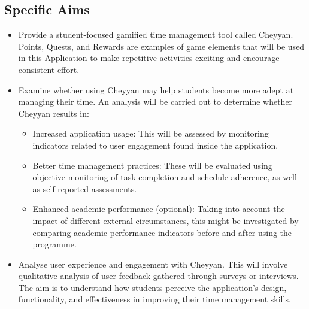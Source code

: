 \documentclass{l4proj}
\begin{document}
\subsection{Specific Aims}
\begin{itemize}
\item 
Provide a student-focused gamified time management tool called Cheyyan. Points, Quests, and Rewards are examples of game elements that will be used in this Application to make repetitive activities exciting and encourage consistent effort.
\item
Examine whether using Cheyyan may help students become more adept at managing their time. An analysis will be carried out to determine whether Cheyyan results in:
\begin{itemize}
    \item
    Increased application usage: This will be assessed by monitoring indicators related to user engagement found inside the application.
    \item
Better time management practices: These will be evaluated using objective monitoring of task completion and schedule adherence, as well as self-reported assessments.
\item
Enhanced academic performance (optional): Taking into account the impact of different external circumstances, this might be investigated by comparing academic performance indicators before and after using the programme.
\end{itemize}
 \item
Analyse user experience and engagement with Cheyyan. This will involve qualitative analysis of user feedback gathered through surveys or interviews. The aim is to understand how students perceive the application's design, functionality, and effectiveness in improving their time management skills.
\end{itemize}



\end{document}

